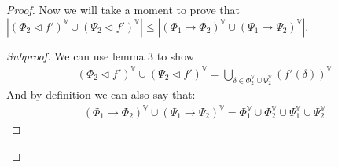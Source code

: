 \documentclass{article}
\newenvironment{subproof}{%
  \begin{proof}[Subproof]%
}{%
  \end{proof}%
}
\begin{document}
\begin{proof}
Now we will take a moment to prove that $|(\Phi_2\lhd f')^\mathbb{V}\cup(\Psi_2\lhd f')^\mathbb{V}| \leq |(\Phi_1\rightarrow\Phi_2)^\mathbb{V} \cup (\Psi_1\rightarrow\Psi_2)^\mathbb{V}|$.
\begin{subproof}
We can use lemma 3 to show
\begin{align*}
(\Phi_2\lhd f')^\mathbb{V}\cup(\Psi_2\lhd f')^\mathbb{V}
= \bigcup_{\delta \in \Phi_2^\mathbb{V}\cup\Psi_2^\mathbb{V}}(f'(\delta))^\mathbb{V}
\end{align*}
And by definition we can also say that:
\begin{align*}
(\Phi_1\rightarrow\Phi_2)^\mathbb{V} \cup (\Psi_1\rightarrow\Psi_2)^\mathbb{V} =
\Phi_1^\mathbb{V}\cup\Phi_2^\mathbb{V} \cup \Psi_1^\mathbb{V}\cup\Psi_2^\mathbb{V}
\end{align*}

\end{subproof}

\end{proof}
\end{document}
